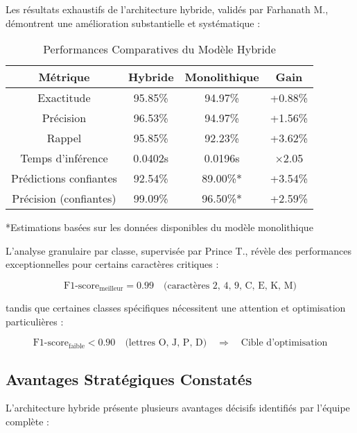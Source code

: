 \documentclass[letterpaper, 10 pt, conference]{ieeeconf}
\begin{document}
Les résultats exhaustifs de l'architecture hybride, validés par Farhanath M., démontrent une amélioration substantielle et systématique :

\begin{table}[h]
\caption{Performances Comparatives du Modèle Hybride}
\label{table_hybride}
\begin{center}
\begin{tabular}{|c|c|c|c|}
\hline
\textbf{Métrique} & \textbf{Hybride} & \textbf{Monolithique} & \textbf{Gain} \\
\hline
Exactitude & 95.85\% & 94.97\% & +0.88\% \\
\hline
Précision & 96.53\% & 94.97\% & +1.56\% \\
\hline
Rappel & 95.85\% & 92.23\% & +3.62\% \\
\hline
Temps d'inférence & 0.0402s & 0.0196s & $\times$2.05 \\
\hline
Prédictions confiantes & 92.54\% & 89.00\%* & +3.54\% \\
\hline
Précision (confiantes) & 99.09\% & 96.50\%* & +2.59\% \\
\hline
\end{tabular}
\end{center}
\end{table}

*Estimations basées sur les données disponibles du modèle monolithique

L'analyse granulaire par classe, supervisée par Prince T., révèle des performances exceptionnelles pour certains caractères critiques :

\begin{equation}
\text{F1-score}_{\text{meilleur}} = 0.99 \quad \text{(caractères 2, 4, 9, C, E, K, M)}
\end{equation}

tandis que certaines classes spécifiques nécessitent une attention et optimisation particulières :

\begin{equation}
\text{F1-score}_{\text{faible}} < 0.90 \quad \text{(lettres O, J, P, D)} \quad \Rightarrow \quad \text{Cible d'optimisation}
\end{equation}

\subsection{Avantages Stratégiques Constatés}

L'architecture hybride présente plusieurs avantages décisifs identifiés par l'équipe complète :
\end{document}
